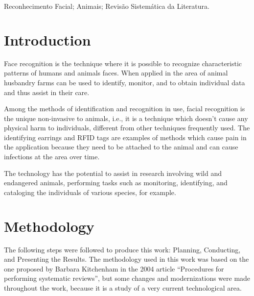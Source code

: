 \documentclass[alpha-refs,english]{RBCA_v3.0}
\begin{document}
\begin{frontmatter}
\begin{palavras_chave} %
	Reconhecimento Facial; Animais; Revisão Sistemática da Literatura.
\end{palavras_chave}

\end{frontmatter}


\section{Introduction}
Face recognition is the technique where it is possible to recognize characteristic patterns of humans and animals faces. When applied in the area of animal husbandry farms can be used to identify, monitor, and to obtain individual data and thus assist in their care.

Among the methods of identification and recognition in use, facial recognition is the unique non-invasive to animals, i.e., it is a technique which doesn’t cause any physical harm to individuals, different from other techniques frequently used. The identifying earrings and RFID tags are examples of methods which cause pain in the application because they need to be attached to the animal and can cause infections at the area over time. 

The technology has the potential to assist in research involving wild and endangered animals, performing tasks such as monitoring, identifying, and cataloging the individuals of various species, for example.

\section{Methodology}
The following steps were followed to produce this work: Planning, Conducting, and Presenting the Results. The methodology used in this work was based on the one proposed by Barbara Kitchenham in the 2004 article “Procedures for performing systematic reviews”\citet{Kitchenham2004}, but some changes and modernizations were made throughout the work, because it is a study of a very current technological area.
\end{document}
